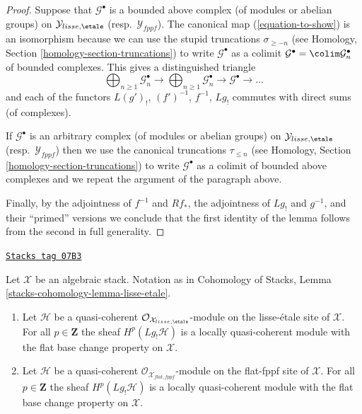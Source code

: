 \begin{proof}
\medskip\noindent
Suppose that $\mathcal{G}^\bullet$ is a bounded above complex
(of modules or abelian groups) on
$\mathcal{Y}_{lisse,\etale}$ (resp.\ $\mathcal{Y}_{fppf}$).
The canonical map (\ref{equation-to-show})
is an isomorphism because we can use the stupid truncations
$\sigma_{\geq -n}$ (see
Homology, Section \ref{homology-section-truncations}) to write
$\mathcal{G}^\bullet$ as a colimit
$\mathcal{G}^\bullet = \colim \mathcal{G}_n^\bullet$
of bounded complexes. This gives a distinguished triangle
$$
\bigoplus\nolimits_{n \geq 1} \mathcal{G}_n^\bullet \to
\bigoplus\nolimits_{n \geq 1} \mathcal{G}_n^\bullet \to
\mathcal{G}^\bullet \to \ldots
$$
and each of the functors $L(g')_!$, $(f')^{-1}$, $f^{-1}$, $Lg_!$
commutes with direct sums (of complexes).

\medskip\noindent
If $\mathcal{G}^\bullet$ is an arbitrary complex
(of modules or abelian groups) on
$\mathcal{Y}_{lisse,\etale}$ (resp.\ $\mathcal{Y}_{fppf}$)
then we use the canonical truncations $\tau_{\leq n}$ (see
Homology, Section \ref{homology-section-truncations})
to write $\mathcal{G}^\bullet$ as a colimit of bounded above complexes
and we repeat the argument of the paragraph above.

\medskip\noindent
Finally, by the adjointness of
$f^{-1}$ and $Rf_*$, the adjointness of $Lg_!$ and $g^{-1}$, and
their ``primed'' versions we conclude that the first
identity of the lemma follows from the second in full generality.
\end{proof}

\begin{lemma}
\label{stacks-perfect-lemma-higher-shriek-quasi-coherent}
\href{https://stacks.math.columbia.edu/tag/07B3}{\texttt{Stacks tag 07B3}}

Let $\mathcal{X}$ be an algebraic stack. Notation as in
Cohomology of Stacks,
Lemma \ref{stacks-cohomology-lemma-lisse-etale}.
\begin{enumerate}
\item Let $\mathcal{H}$ be a quasi-coherent
$\mathcal{O}_{\mathcal{X}_{lisse,\etale}}$-module
on the lisse-\'etale site of $\mathcal{X}$. For all $p \in \mathbf{Z}$
the sheaf $H^p(Lg_!\mathcal{H})$ is a locally quasi-coherent module with
the flat base change property on $\mathcal{X}$.
\item Let $\mathcal{H}$ be a quasi-coherent
$\mathcal{O}_{\mathcal{X}_{flat,fppf}}$-module
on the flat-fppf site of $\mathcal{X}$. For all $p \in \mathbf{Z}$
the sheaf $H^p(Lg_!\mathcal{H})$ is a locally quasi-coherent module with the
flat base change property on $\mathcal{X}$.
\end{enumerate}
\end{lemma}

